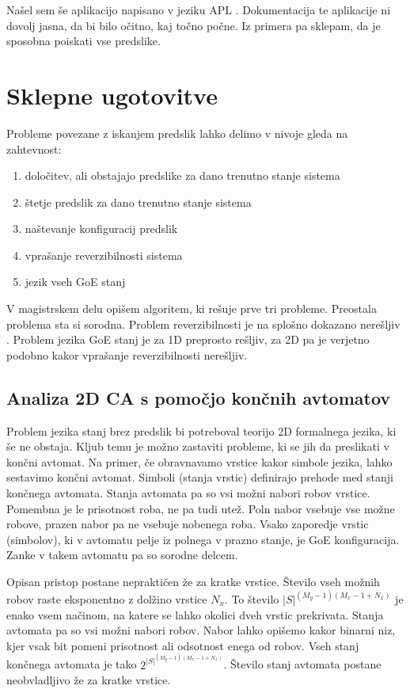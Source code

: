\documentclass[12pt,a4paper,openany,twoside]{book}
\begin{document}
Našel sem še aplikacijo napisano v jeziku APL \cite{ionreq2013}.
Dokumentacija te aplikacije ni dovolj jasna, da bi bilo očitno, kaj točno počne.
Iz primera pa sklepam, da je sposobna poiskati vse predslike.

\chapter{Sklepne ugotovitve}

Probleme povezane z iskanjem predslik lahko delimo v nivoje gleda na zahtevnost:
\begin{enumerate}
\item določitev, ali obstajajo predslike za dano trenutno stanje sistema
\item štetje predslik za dano trenutno stanje sistema
\item naštevanje konfiguracij predslik
\item vprašanje reverzibilnosti sistema
\item jezik vseh GoE stanj
\end{enumerate}

V magistrskem delu opišem algoritem, ki rešuje prve tri probleme.
Preostala problema sta si sorodna.
Problem reverzibilnosti je na splošno dokazano nerešljiv \cite{Kari1989}.
Problem jezika GoE stanj je za 1D preprosto rešljiv, za 2D pa je
verjetno podobno kakor vprašanje reverzibilnosti nerešljiv.

\section{Analiza 2D CA s pomočjo končnih avtomatov}

Problem jezika stanj brez predslik bi potreboval teorijo 2D formalnega jezika, ki še ne obstaja.
Kljub temu je možno zastaviti probleme, ki se jih da preslikati v končni avtomat.
Na primer, če obravnavamo vrstice kakor simbole jezika, lahko sestavimo končni avtomat.
Simboli (stanja vrstic) definirajo prehode med stanji končnega avtomata. Stanja avtomata pa
so vsi možni nabori robov vrstice. Pomembna je le prisotnost roba, ne pa tudi utež.
Poln nabor vsebuje vse možne robove, prazen nabor pa ne vsebuje nobenega roba.
Vsako zaporedje vrstic (simbolov), ki v avtomatu pelje iz polnega v prazno stanje, je GoE konfiguracija.
Zanke v takem avtomatu pa so sorodne delcem.

Opisan pristop postane nepraktičen že za kratke vrstice.
Število vseh možnih robov raste eksponentno z dolžino vrstice \(N_x\).
To število \(|S|^{(M_y-1)(M_x-1+N_x)}\) je enako vsem načinom,
na katere se lahko okolici dveh vrstic prekrivata.
Stanja avtomata pa so vsi možni nabori robov.
Nabor lahko opišemo kakor binarni niz, kjer vsak bit pomeni
prisotnost ali odsotnost enega od robov.
Vseh stanj končnega avtomata je tako \(2^{ |S|^{(M_y-1)(M_x-1+N_x)} }\).
Število stanj avtomata postane neobvladljivo že za kratke vrstice.
\end{document}
